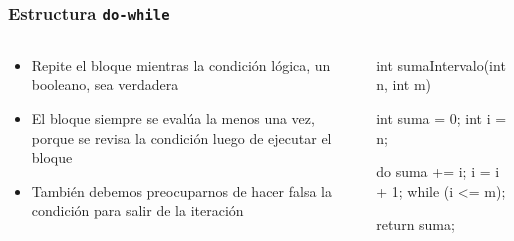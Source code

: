 \documentclass{beamer}
\newcommand{\codet}[1]{\texttt{#1}}
\begin{document}
\begin{frame}[fragile]
  \frametitle{Estructura \codet{do-while}}

  \begin{columns}
    \begin{column}{0.4\textwidth}
      \begin{itemize}
        
      \item Repite el bloque mientras la condición lógica, un
        booleano, sea verdadera
        
      \item El bloque siempre se evalúa la menos una vez, porque se
        revisa la condición luego de ejecutar el bloque
        
      \item También debemos preocuparnos de hacer falsa la condición
        para salir de la iteración

      \end{itemize}      
    \end{column}
    \begin{column}{0.6\textwidth}
\begin{jsmall}
        int sumaIntervalo(int n, int m) {
          int suma = 0;
          int i = n;

          do {
            suma += i;
            i = i + 1;
          } while (i <= m);          

          return suma;
        }
\end{jsmall}
    \end{column}
  \end{columns}
\end{frame}
\end{document}

